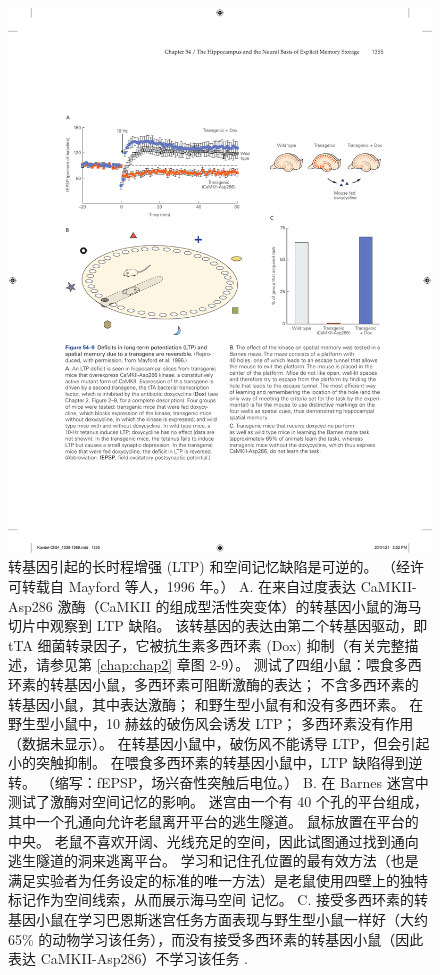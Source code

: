 \begin{figure}[htbp]
	\centering
	\includegraphics[width=0.9\linewidth]{chap54/fig_54_9}
	\caption{转基因引起的长时程增强 (LTP) 和空间记忆缺陷是可逆的。 （经许可转载自 Mayford 等人，1996 年。） A. 在来自过度表达 CaMKII-Asp286 激酶（CaMKII 的组成型活性突变体）的转基因小鼠的海马切片中观察到 LTP 缺陷。 该转基因的表达由第二个转基因驱动，即 tTA 细菌转录因子，它被抗生素多西环素 (Dox) 抑制（有关完整描述，请参见第 \ref{chap:chap2} 章图 2-9）。 测试了四组小鼠：喂食多西环素的转基因小鼠，多西环素可阻断激酶的表达； 不含多西环素的转基因小鼠，其中表达激酶； 和野生型小鼠有和没有多西环素。 在野生型小鼠中，10 赫兹的破伤风会诱发 LTP； 多西环素没有作用（数据未显示）。 在转基因小鼠中，破伤风不能诱导 LTP，但会引起小的突触抑制。 在喂食多西环素的转基因小鼠中，LTP 缺陷得到逆转。 （缩写：fEPSP，场兴奋性突触后电位。） B. 在 Barnes 迷宫中测试了激酶对空间记忆的影响。 迷宫由一个有 40 个孔的平台组成，其中一个孔通向允许老鼠离开平台的逃生隧道。 鼠标放置在平台的中央。 老鼠不喜欢开阔、光线充足的空间，因此试图通过找到通向逃生隧道的洞来逃离平台。 学习和记住孔位置的最有效方法（也是满足实验者为任务设定的标准的唯一方法）是老鼠使用四壁上的独特标记作为空间线索，从而展示海马空间 记忆。 C. 接受多西环素的转基因小鼠在学习巴恩斯迷宫任务方面表现与野生型小鼠一样好（大约 65\% 的动物学习该任务），而没有接受多西环素的转基因小鼠（因此表达 CaMKII-Asp286）不学习该任务 .}
	\label{fig:54_9}
\end{figure}


